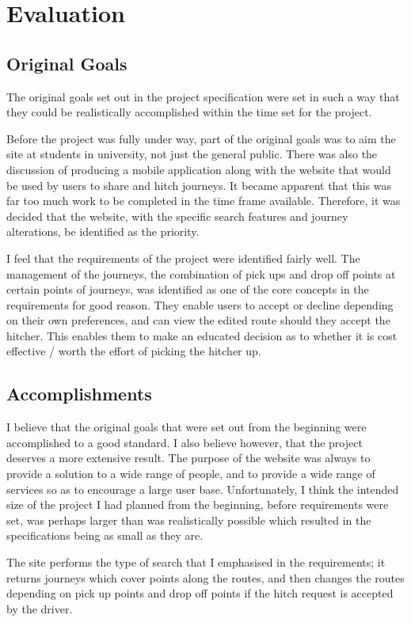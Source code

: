 \chapter{Evaluation}

\section{Original Goals}
The original goals set out in the project specification were set in such a way that they could be realistically accomplished within the time set for the project. 

Before the project was fully under way, part of the original goals was to aim the site at students in university, not just the general public. There was also the discussion of producing a mobile application along with the website that would be used by users to share and hitch journeys. It became apparent that this was far too much work to be completed in the time frame available. Therefore, it was decided that the website, with the specific search features and journey alterations, be identified as the priority.

I feel that the requirements of the project were identified fairly well. The management of the journeys, the combination of pick ups and drop off points at certain points of journeys, was identified as one of the core concepts in the requirements for good reason. They enable users to accept or decline depending on their own preferences, and can view the edited route should they accept the hitcher. This enables them to make an educated decision as to whether it is cost effective / worth the effort of picking the hitcher up.

\section{Accomplishments}
I believe that the original goals that were set out from the beginning were accomplished to a good standard. I also believe however, that the project deserves a more extensive result. The purpose of the website was always to provide a solution to a wide range of people, and to provide a wide range of services so as to encourage a large user base. Unfortunately, I think the intended size of the project I had planned from the beginning, before requirements were set, was perhaps larger than was realistically possible which resulted in the specifications being as small as they are. 

The site performs the type of search that I emphasised in the requirements; it returns journeys which cover points along the routes, and then changes the routes depending on pick up points and drop off points if the hitch request is accepted by the driver. 

